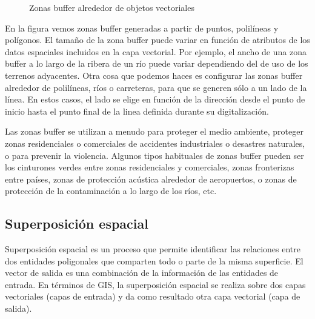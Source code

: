 \begin{figure}[H]
    \centering
    \caption{Zonas buffer alrededor de objetos vectoriales} \label{fig:buffer} 
\end{figure} 

En la figura \label{ref:buffer} vemos zonas buffer generadas a partir de puntos, polilíneas y polígonos. 
El tamaño de la zona buffer puede variar en función de atributos de los datos espaciales incluidos en la capa vectorial.
Por ejemplo, el ancho de una zona buffer a lo largo de la ribera de un río puede variar dependiendo del de uso de los terrenos adyacentes.
Otra cosa que podemos haces es configurar las zonas buffer alrededor de polilíneas, ríos o carreteras, para que se generen sólo a un lado de la línea.
En estos casos, el lado se elige en función de la dirección desde el punto de inicio hasta el punto final de la linea definida durante su digitalización.
 
Las zonas buffer se utilizan a menudo para proteger el medio ambiente, proteger zonas residenciales o comerciales de accidentes industriales o desastres naturales, o para prevenir la violencia.
Algunos tipos habituales de zonas buffer pueden ser los cinturones verdes entre zonas residenciales y comerciales, zonas fronterizas entre países, 
zonas de protección acústica alrededor de aeropuertos, o zonas de protección de la contaminación a lo largo de los ríos, etc.

\subsection{Superposición espacial}
Superposición espacial es un proceso que permite identificar las relaciones entre dos entidades poligonales que comparten todo o parte de la misma superficie. 
El vector de salida es una combinación de la información de las entidades de entrada.
En términos de GIS, la superposición espacial se realiza sobre dos capas vectoriales (capas de entrada) y da como resultado otra capa vectorial (capa de salida). 

